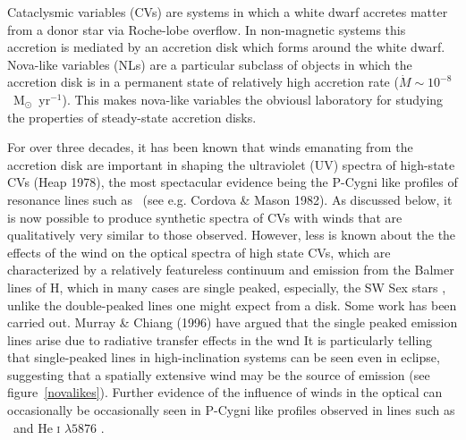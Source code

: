 \documentclass[preprint, a4paper, 11pt]{aastex}
\begin{document}
Cataclysmic variables (CVs) are systems in which a white dwarf accretes matter from a donor
star via Roche-lobe overflow. In non-magnetic systems this accretion
is mediated by an accretion disk which forms around the white dwarf. 
Nova-like variables (NLs) are a particular subclass of objects in which the accretion disk
is in a permanent state of relatively high accretion rate 
($\dot{M} \sim 10^{-8}$~M$_{\odot}$~yr$^{-1}$).  This makes nova-like variables the obviousl
laboratory for studying the properties of steady-state accretion disks.

For over three decades, it has been known that winds emanating from the accretion disk
are important in shaping the ultraviolet (UV) spectra of high-state CVs (Heap 1978), 
the most spectacular evidence being the P-Cygni like profiles of resonance lines such as 
\civfull\ (see e.g. Cordova \& Mason 1982\nocite{cordova1982}).  As discussed below, it is now possible to produce synthetic spectra 
of CVs with winds that are qualitatively very similar to those observed.  However, less is known about the 
the effects of the wind on the optical spectra of high state CVs, which are characterized by a relatively featureless 
continuum and  emission from the
Balmer lines of H, which in many cases are single peaked, especially, the SW Sex stars \citep{HSK86, DR95}, unlike the double-peaked lines one might expect from a disk.   Some work has been carried out.
Murray \& Chiang (1996) have argued that the single peaked emission lines arise due to radiative transfer effects in the wnd
It is particularly telling that single-peaked 
lines in high-inclination systems can be seen even in eclipse, suggesting 
that a spatially extensive wind may be the source of emission (see figure~\ref{novalikes}).
Further evidence of the influence of winds in the optical can occasionally 
be occasionally seen in P-Cygni like profiles observed in lines such as \ha\ 
and He \textsc{i} $\lambda5876$ \citep{RN98}.
\end{document}
